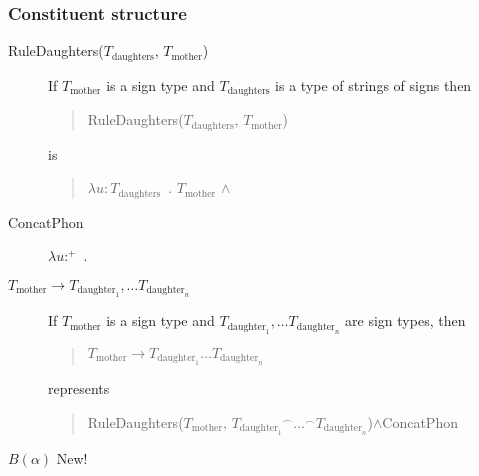 \subsubsection{Constituent structure} 
\begin{description}
  
  
\item[\textnormal{RuleDaughters($T_{\text{daughters}}$,
$T_{\text{mother}}$)}] \mbox{}

If $T_{\text{mother}}$ is a sign type and $T_{\text{daughters}}$ is a
type of strings of signs then
\begin{quote}
RuleDaughters($T_{\text{daughters}}$,
$T_{\text{mother}}$)
\end{quote}
is
\begin{quote}
  $\lambda u\! :\! T_{\text{daughters}}$\ . $T_{\text{mother}}$ \d{$\wedge$} 
\end{quote}

\item[\textnormal{ConcatPhon}] \mbox{}

  $\lambda
u$:$^+$\
. \\
\hspace*{1em}

\item[\textnormal{$T_{\text{mother}}\longrightarrow T_{\text{daughter}_1},\ldots
    T_{\text{daughter}_n}$}] \mbox{}

  If $T_{\text{mother}}$ is a sign type and
  $T_{\text{daughter}_1},\ldots T_{\text{daughter}_n}$ are sign types,
  then
  \begin{quote}
    $T_{\text{mother}}\longrightarrow T_{\text{daughter}_1}\ldots
    T_{\text{daughter}_n}$
  \end{quote}
  represents
  \begin{quote}
RuleDaughters($T_{\text{mother}}$,
${T_{\text{daughter}_1}}^\frown\ldots^\frown T_{\text{daughter}_n}$)\d{\d{$\wedge$}}ConcatPhon 
\end{quote}


\item[\textnormal{$B(\alpha)$} New!] \mbox{}


\end{description}
